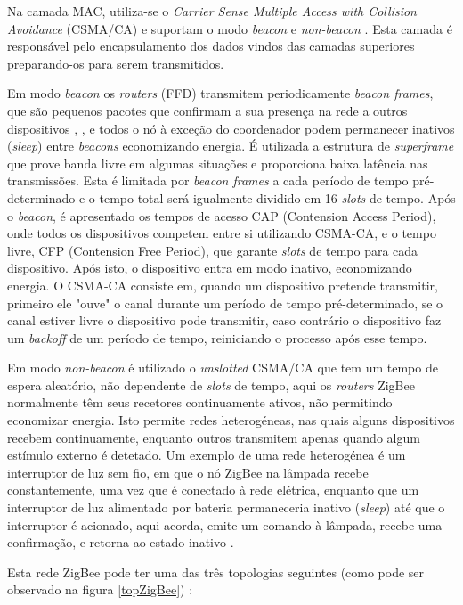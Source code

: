 \documentclass[conference]{IEEEtran}
\begin{document}
Na camada MAC, utiliza-se o \textit{Carrier Sense Multiple Access with Collision Avoidance} (CSMA/CA) e suportam o modo \textit{beacon} e \textit{non-beacon} \cite{liang2006impact}.
Esta camada é responsável pelo encapsulamento dos dados vindos das camadas superiores preparando-os para serem transmitidos.

Em modo \textit{beacon} os \textit{routers} (FFD) transmitem periodicamente \textit{beacon frames}, que são pequenos pacotes que confirmam a sua presença na rede a outros dispositivos \cite{cirilo2014computaccao}, \cite{liang2006impact}, e todos o nó à exceção do coordenador podem permanecer inativos (\textit{sleep}) entre \textit{beacons} economizando energia.
É utilizada a estrutura de \textit{superframe} que prove banda livre em algumas situações e proporciona baixa latência nas transmissões.
Esta é limitada por \textit{beacon frames} a cada período de tempo pré-determinado e o tempo total será igualmente dividido em 16 \textit{slots} de tempo.
Após o \textit{beacon}, é apresentado os tempos de acesso CAP (Contension Access Period), onde todos os dispositivos competem entre si utilizando CSMA-CA, e o tempo livre, CFP (Contension Free Period), que garante \textit{slots} de tempo para cada dispositivo. Após isto, o dispositivo entra em modo inativo, economizando energia.
O CSMA-CA consiste em, quando um dispositivo pretende transmitir, primeiro ele "ouve" o canal durante um período de tempo pré-determinado, se o canal estiver livre o dispositivo pode transmitir, caso contrário o dispositivo faz um \textit{backoff} de um período de tempo, reiniciando o processo após esse tempo.

Em modo \textit{non-beacon} é utilizado o \textit{unslotted} CSMA/CA que tem um tempo de espera aleatório, não dependente de \textit{slots} de tempo, aqui os \textit{routers} ZigBee normalmente têm seus recetores continuamente ativos, não permitindo economizar energia.
Isto permite redes heterogéneas, nas quais alguns dispositivos recebem continuamente, enquanto outros transmitem apenas quando algum estímulo externo é detetado. 
Um exemplo de uma rede heterogénea é um interruptor de luz sem fio, em que o nó ZigBee na lâmpada recebe constantemente, uma vez que é conectado à rede elétrica, enquanto que um interruptor de luz alimentado por bateria permaneceria inativo (\textit{sleep}) até que o interruptor é acionado, aqui acorda, emite um comando à lâmpada, recebe uma confirmação, e retorna ao estado inativo \cite{zigbee_online}.

Esta rede ZigBee pode ter uma das três topologias seguintes (como pode ser observado na figura \ref{topZigBee}) \cite{sinem2004zigbee}:
\end{document}
